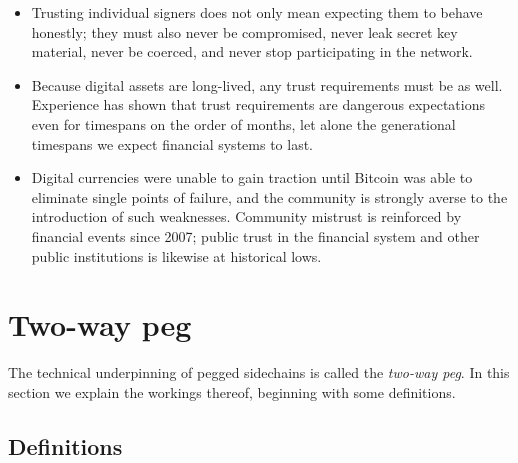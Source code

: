 \documentclass[letterpaper]{article}
\newcommand{\peggedsidechains}{pegged sidechains\xspace}
\newcommand{\twowp}{two-way peg\xspace}
\begin{document}
\begin{itemize}
\item Trusting individual signers does not only mean expecting them to behave honestly;
they must also never be compromised, never leak secret key material, never be coerced,
and never stop participating in the network.

\item Because digital assets are long-lived, any trust requirements must be as well.
Experience has shown that trust requirements are
dangerous expectations even for timespans on the order of months, let alone the
generational timespans we expect financial systems to last.

\item Digital currencies were unable to gain traction until Bitcoin was able to eliminate
single points of failure, and the community is strongly averse to the introduction of such
weaknesses. Community mistrust is reinforced by financial events since 2007; public
trust in the financial system and other public institutions is likewise at historical lows.
\end{itemize}

\section{Two-way peg\label{def}}

The technical underpinning of \peggedsidechains is called
the \emph{\twowp}. In this section we explain the workings thereof, beginning
with some definitions.

\subsection{Definitions}
\end{document}
